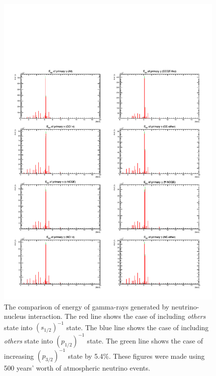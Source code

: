 \begin{figure}[h]
	\centering
	\includegraphics[width=16cm]{PDF/NEUT/Comparison/gamma/EnePri}
	\caption[The comparison of energy of gamma-rays generated by neutrino-nucleus interaction]{
	The comparison of energy of gamma-rays generated by neutrino-nucleus interaction.
	The red line shows the case of including \textit{others} state into $(s_{1/2})^{-1}$ state.
	The blue line shows the case of including \textit{others} state into $(p_{1/2})^{-1}$ state.
	The green line shows the case of increasing $(p_{3/2})^{-1}$ state by 5.4\%.
	These figures were made using 500 years' worth of atmospheric neutrino events.
	}\label{Comp_gammaEnePri}
\end{figure}

